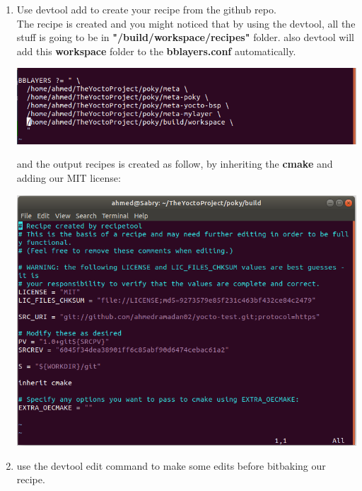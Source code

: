 \documentclass{article}
\begin{document}
\begin{enumerate}
  \item Use devtool add to create your recipe from the github repo.\\
  
  
  The recipe is created and you might noticed that by using the devtool, all the stuff is going to be in \textbf{"/build/workspace/recipes"} folder. also devtool will add this \textbf{workspace} folder to the \textbf{bblayers.conf} automatically.
  \begin{center}
    \includegraphics[scale=0.60]{./resources/img/devtool-bblayers.png}
  \end{center}

  and the output recipes is created as follow, by inheriting the \textbf{cmake} and adding our MIT license:
  \begin{center}
    \includegraphics[scale=0.60]{./resources/img/devtool-edit-recipe.png}
  \end{center}
  

  \item use the devtool edit command to make some edits before bitbaking our recipe.
  


\end{enumerate}
\end{document}

